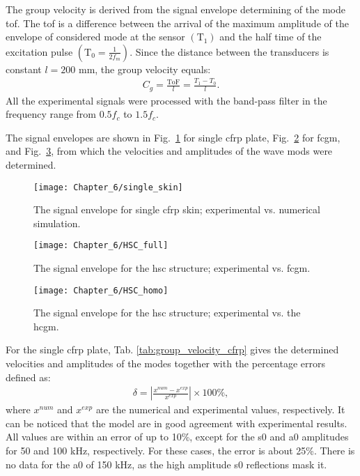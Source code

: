 The group velocity is derived from the signal envelope determining of the mode \ac{tof}.
The \ac{tof} is a difference between the arrival of the maximum amplitude of the envelope of considered mode at the sensor \((\mathrm{T}_1)\) and the half time of the excitation pulse \(\left(\mathrm{T}_0=\frac{1}{2f_m}\right)\).
Since the distance between the transducers is constant \(l=200\) \unit{\mm}, the group velocity equals:
\begin{eqnarray}
	C_g = \frac{\mathrm{ToF}}{l}=\frac{T_1-T_0}{l}.
\end{eqnarray}
All the experimental signals were processed with the band-pass filter in the frequency range from \(0.5f_c\) to \(1.5f_c\).

The signal envelopes are shown in Fig.~\ref{fig:single_skin} for single \ac{cfrp} plate, Fig.~\ref{fig:hsc_full} for \ac{fcgm}, and Fig.~\ref{fig:hsc_homo}, from which the velocities and amplitudes of the wave mods were determined.
\begin{figure}[H]
	\begin{center}
		\texttt{[image: Chapter\_6/single\_skin]}
	\end{center}
	\caption{The signal envelope for single \acf{cfrp} skin; experimental vs. numerical simulation.}
	\label{fig:single_skin}
\end{figure}
\begin{figure}[H]
	\begin{center}
		\texttt{[image: Chapter\_6/HSC\_full]}
	\end{center}
	\caption{The signal envelope for the \acf{hsc} structure; experimental vs. \acf{fcgm}.}
	\label{fig:hsc_full}
\end{figure}
\begin{figure}[H]
	\begin{center}
		\texttt{[image: Chapter\_6/HSC\_homo]}
	\end{center}
	\caption{The signal envelope for the \acf{hsc} structure; experimental vs. the \acf{hcgm}.}
	\label{fig:hsc_homo}
\end{figure}

For the single \ac{cfrp} plate, Tab. \ref{tab:group_velocity_cfrp} gives the determined velocities and amplitudes of the modes together with the percentage errors defined as:
\begin{eqnarray}
	\delta = \left|\frac{x^{num}-x^{exp}}{x^{exp}}\right|\times100\%,
\end{eqnarray}
where \(x^{num}\) and \(x^{exp}\) are the numerical and experimental values, respectively.
It can be noticed that the model are in good agreement with experimental results.
All values are within an error of up to 10\%, except for the \ac{s0} and \ac{a0} amplitudes for 50 and 100 \unit{\kHz}, respectively.
For these cases, the error is about 25\%.
There is no data for the \ac{a0} of 150 \unit{\kHz}, as the high amplitude \ac{s0} reflections mask it.

